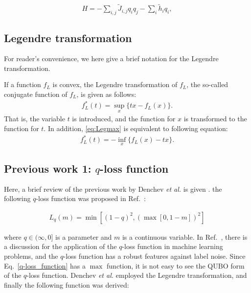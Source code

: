 \documentclass[fp,twocolumn]{jpsj3}
\begin{document}
\begin{eqnarray}
  H=-\sum_{i,j}{\widetilde{J}_{i,j}q_{i}q_{j}}-\sum_{i}{\widetilde{h}_{i}q_{i}},
\end{eqnarray}




\subsection{Legendre transformation}

For reader's convenience, we here give a brief notation for the Legendre transformation.

If a function $f_{L}$ is convex, the Legendre transformation of $f_{L}$, the so-called conjugate function of $f_{L}$, is given as follows:
\begin{align}
\label{eq:Legmax}
f_{L}^{*}(t)=\sup_{x}\{t x - f_{L}(x)\}.
\end{align}
That is, the variable $t$ is introduced, and the function for $x$ is transformed to the function for $t$.
In addition, \eqref{eq:Legmax} is equivalent to following equation:
\begin{align}
\label{eq:Legmin}
f_{L}^{*}(t)=-\inf_{x}\{f_{L}(x) - t x\}.
\end{align}


\subsection{Previous work 1: $q$-loss function}

Here, a brief review of the previous work by Denchev \textit{et al.} is given \cite{q-loss}.
the following $q$-loss function was proposed in Ref.~:

\begin{eqnarray}
  L_{q}(m)=\min{[(1-q)^{2}, (\max{[0,1-m]})^{2}]} \label{q-loss_function}
\end{eqnarray}

\noindent
where $q \in (\infty,0]$ is a parameter and $m$ is a continuous variable. 
In Ref.~, there is a discussion for the application of the $q$-loss function in machine learning problems, and the $q$-loss function has a robust features against label noise.
Since Eq.~\ref{q-loss_function} has a $\max$ function, it is not easy to see the QUBO form of the $q$-loss function.
Denchev \textit{et al.} employed the Legendre transformation,
and finally the following function was derived\cite{q-loss}:
\end{document}
